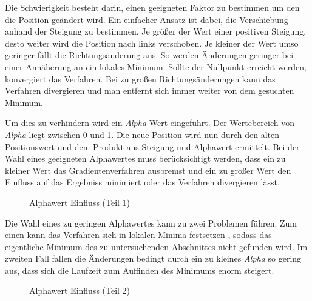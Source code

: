 Die Schwierigkeit besteht darin, einen geeigneten Faktor zu bestimmen um den die Position geändert wird. Ein einfacher Ansatz ist dabei, die Verschiebung anhand der Steigung zu bestimmen. Je größer der Wert einer positiven Steigung, desto weiter wird die Position nach links verschoben. Je kleiner der Wert umso geringer fällt die Richtungsänderung aus. So werden Änderungen geringer bei einer Annäherung an ein lokales Minimum. Sollte der Nullpunkt erreicht werden, konvergiert das Verfahren. Bei zu großen Richtungsänderungen kann das Verfahren divergieren und man entfernt sich immer weiter von dem gesuchten Minimum.

Um dies zu verhindern wird ein \emph{Alpha} Wert eingeführt. Der Wertebereich von \emph{Alpha} liegt zwischen 0 und 1. Die neue Position wird nun durch den alten Positionswert und dem Produkt aus Steigung und Alphawert ermittelt. Bei der Wahl eines geeigneten Alphawertes muss berücksichtigt werden, dass ein zu kleiner Wert das Gradientenverfahren ausbremst und ein zu großer Wert den Einfluss auf das Ergebniss minimiert oder das Verfahren divergieren lässt.

\begin{figure}[h!]
	\begin{center}
	\caption{Alphawert Einfluss (Teil 1)}
	\label{alpha1}
	\end{center}
\end{figure}

Die Wahl eines zu geringen Alphawertes kann zu zwei Problemen führen. Zum einen kann das Verfahren sich in lokalen Minima festsetzen , sodass das eigentliche Minimum des zu untersuchenden Abschnittes nicht gefunden wird. Im zweiten Fall  fallen die Änderungen bedingt durch ein zu kleines \emph{Alpha} so gering aus, dass sich die Laufzeit zum Auffinden des Minimums enorm steigert.

\begin{figure}[h!]
	\begin{center}
	\caption{Alphawert Einfluss (Teil 2)}
	\label{alpha2}
	\end{center}
\end{figure}


